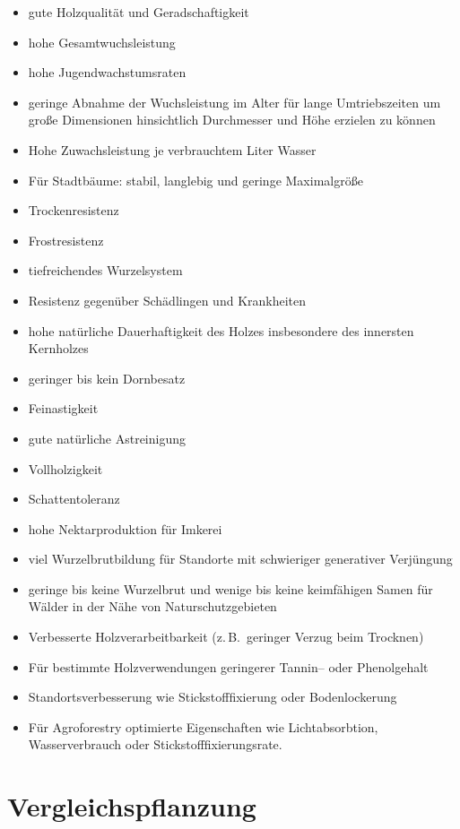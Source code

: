 \documentclass[twocolumn]{scrartcl}
\begin{document}
\begin{itemize}
  \item gute Holzqualität und Geradschaftigkeit
  \item hohe Gesamtwuchsleistung
  \item hohe Jugendwachstumsraten
  \item geringe Abnahme der Wuchsleistung im Alter für lange Umtriebszeiten um große Dimensionen hinsichtlich Durchmesser und Höhe erzielen zu können
  \item Hohe Zuwachsleistung je verbrauchtem Liter Wasser
  \item Für Stadtbäume: stabil, langlebig und geringe Maximalgröße 
  \item Trockenresistenz
  \item Frostresistenz
  \item tiefreichendes Wurzelsystem
  \item Resistenz gegenüber Schädlingen und Krankheiten
  \item hohe natürliche Dauerhaftigkeit des Holzes insbesondere des innersten Kernholzes
  \item geringer bis kein Dornbesatz
  \item Feinastigkeit
  \item gute natürliche Astreinigung
  \item Vollholzigkeit
  \item Schattentoleranz
  \item hohe Nektarproduktion für Imkerei
  \item viel Wurzelbrutbildung für Standorte mit schwieriger generativer Verjüngung
  \item geringe bis keine Wurzelbrut und wenige bis keine keimfähigen Samen für Wälder in der Nähe von Naturschutzgebieten
  \item Verbesserte Holzverarbeitbarkeit (z.\,B.\ geringer Verzug beim Trocknen)
  \item Für bestimmte Holzverwendungen geringerer Tannin-- oder Phenolgehalt
  \item Standortsverbesserung wie Stickstofffixierung oder Bodenlockerung
  \item Für Agroforestry optimierte Eigenschaften wie Lichtabsorbtion, Wasserverbrauch oder Stickstofffixierungsrate.
\end{itemize}

\section{Vergleichspflanzung}
\end{document}
